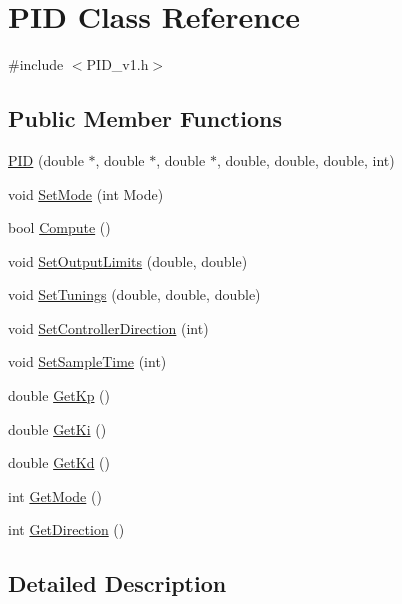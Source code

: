 \hypertarget{class_p_i_d}{}\section{P\+ID Class Reference}
\label{class_p_i_d}


{\ttfamily \#include $<$P\+I\+D\+\_\+v1.\+h$>$}

\subsection*{Public Member Functions}
\begin{DoxyCompactItemize}
\item 
\hyperlink{class_p_i_d_aba833737b9cb8a9da181d392a0306c1b}{P\+ID} (double $\ast$, double $\ast$, double $\ast$, double, double, double, int)
\item 
void \hyperlink{class_p_i_d_a68074bad88a8cc442ee03a036073d5d5}{Set\+Mode} (int Mode)
\item 
bool \hyperlink{class_p_i_d_a8d154fe921cba7963c49d7d2b42eccf1}{Compute} ()
\item 
void \hyperlink{class_p_i_d_a5645914427bd740b12faa97cc25a8414}{Set\+Output\+Limits} (double, double)
\item 
void \hyperlink{class_p_i_d_a848bb1bbeabd59d38c9c955958e3e798}{Set\+Tunings} (double, double, double)
\item 
void \hyperlink{class_p_i_d_a66df966f739e19482aaba38cf9308c4e}{Set\+Controller\+Direction} (int)
\item 
void \hyperlink{class_p_i_d_aaa1e0e67a0c97571bd62b326e6cf3b2e}{Set\+Sample\+Time} (int)
\item 
double \hyperlink{class_p_i_d_ae5519c833b2887a0e6aad670d9b3d8b8}{Get\+Kp} ()
\item 
double \hyperlink{class_p_i_d_ac7ba6bc99c76c4378d699e176c81491c}{Get\+Ki} ()
\item 
double \hyperlink{class_p_i_d_a62b7e8dca41e724e1ad62dec930058d8}{Get\+Kd} ()
\item 
int \hyperlink{class_p_i_d_acc325db5e6a140b92c8199a66e03491b}{Get\+Mode} ()
\item 
int \hyperlink{class_p_i_d_a2a8674f4c8937dfdf859f6a3ad9f45d5}{Get\+Direction} ()
\end{DoxyCompactItemize}


\subsection{Detailed Description}


